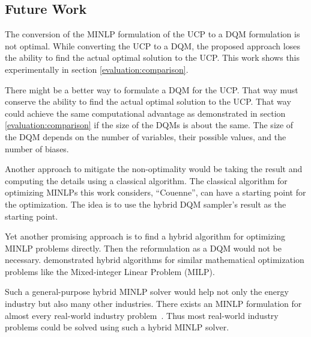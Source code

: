 \subsection*{Future Work}


The conversion of the MINLP formulation of the UCP to a DQM formulation is not optimal.
While converting the UCP to a DQM, the proposed approach loses the ability to find the actual optimal solution to the UCP.
This work shows this experimentally in section \ref{evaluation:comparison}.

There might be a better way to formulate a DQM for the UCP.
That way must conserve the ability to find the actual optimal solution to the UCP.
That way could achieve the same computational advantage as demonstrated in section \ref{evaluation:comparison} if the size of the DQMs is about the same.
The size of the DQM depends on the number of variables, their possible values, and the number of biases.

Another approach to mitigate the non-optimality would be taking the result and computing the details using a classical algorithm.
The classical algorithm for optimizing MINLPs this work considers, ``Couenne'', can have a starting point for the optimization.
The idea is to use the hybrid DQM sampler's result as the starting point.

Yet another promising approach is to find a hybrid algorithm for optimizing MINLP problems directly.
Then the reformulation as a DQM would not be necessary.
\citeauthor{Ajagekar2020} demonstrated hybrid algorithms for similar mathematical optimization problems like the Mixed-integer Linear Problem (MILP).

Such a general-purpose hybrid MINLP solver would help not only the energy industry but also many other industries.
There exists an MINLP formulation for almost every real-world industry problem~\cite{Belotti2009}.
Thus most real-world industry problems could be solved using such a hybrid MINLP solver.
